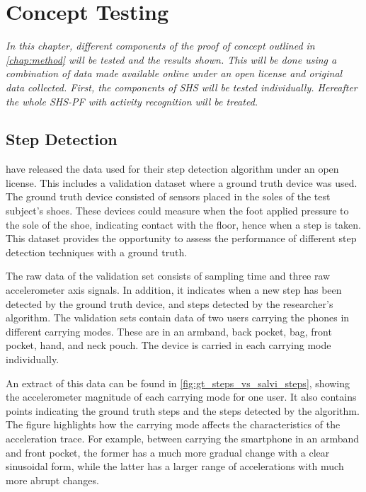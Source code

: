 \chapter{Concept Testing}

\textit{In this chapter, different components of the proof of concept outlined in \cref{chap:method} will be tested and the results shown. This will be done using a combination of data made available online under an open license and original data collected. First, the components of SHS will be tested individually. Hereafter the whole SHS-PF with activity recognition will be treated.}

\section{Step Detection}
\citet{Salvi2018} have released the data used for their step detection algorithm under an open license. This includes a validation dataset where a ground truth device was used. The ground truth device consisted of sensors placed in the soles of the test subject's shoes. These devices could measure when the foot applied pressure to the sole of the shoe, indicating contact with the floor, hence when a step is taken. This dataset provides the opportunity to assess the performance of different step detection techniques with a ground truth.\par

The raw data of the validation set consists of sampling time and three raw accelerometer axis signals. In addition, it indicates when a new step has been detected by the ground truth device, and steps detected by the researcher's algorithm. The validation sets contain data of two users carrying the phones in different carrying modes. These are in an armband, back pocket, bag, front pocket, hand, and neck pouch. The device is carried in each carrying mode individually.\par

An extract of this data can be found in \cref{fig:gt_steps_vs_salvi_steps}, showing the accelerometer magnitude of each carrying mode for one user. It also contains points indicating the ground truth steps and the steps detected by the \citet{Salvi2018} algorithm. The figure highlights how the carrying mode affects the characteristics of the acceleration trace. For example, between carrying the smartphone in an armband and front pocket, the former has a much more gradual change with a clear sinusoidal form, while the latter has a larger range of accelerations with much more abrupt changes. 



